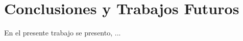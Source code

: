 \def\baselinestretch{1}
\chapter{Conclusiones y Trabajos Futuros}
\label{chap5}
\ifpdf
    \graphicspath{{Conclusions/ConclusionsFigs/PNG/}{Conclusions/ConclusionsFigs/PDF/}{Conclusions/ConclusionsFigs/}}
\else
    \graphicspath{{Conclusions/ConclusionsFigs/EPS/}{Conclusions/ConclusionsFigs/}}
\fi
\def\baselinestretch{1.66}


En el presente trabajo se presento, ...
